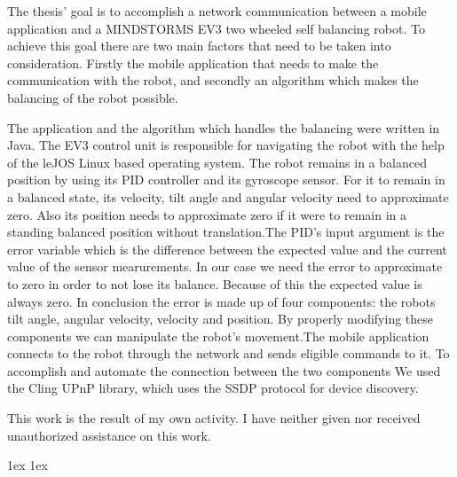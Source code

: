 \documentclass[final]{ubb_dolgozat}
\author{
Márton Zete-Örs
}
\begin{document}
\begin{abstractEN}
	
The thesis’ goal is to accomplish a network communication between a mobile application and a MINDSTORMS EV3 two wheeled self balancing robot. To achieve this goal there are two main factors that need to be taken into consideration. Firstly the mobile application that needs to make the communication with the robot, and secondly an algorithm which makes the balancing of the robot possible.

The application and the algorithm which handles the balancing were written in Java. The EV3 control unit is responsible for navigating the robot with the help of the leJOS Linux based operating system. The robot remains in a balanced position by using its PID controller and its gyroscope sensor. For it to remain in a balanced state, its velocity, tilt angle and angular velocity need to approximate zero. Also its position needs to approximate zero if it were to remain in a standing balanced position without translation.The PID’s input argument is the error variable which is the difference between the expected value and the current value of the sensor mearurements. In our case we need the error to approximate to zero in order to not lose its balance. Because of this the expected value is always zero. In conclusion the error is made up of four components: the robots tilt angle, angular velocity, velocity and position. By properly modifying these components we can manipulate the robot’s movement.The mobile application connects to the robot through the network and sends eligible commands to it. To accomplish and automate the connection between the two components We used the Cling UPnP library, which uses the SSDP protocol for device discovery.

This work is the result of my own activity. I have neither given nor received unauthorized assistance on this work.

\end{abstractEN}

\maketitle

{ \baselineskip 1ex
  \parskip 1ex
  \tableofcontents
}





%
%
%
\appendix

{ 
	\renewcommand{\baselinestretch}{1.4}\normalsize %
	\setlength{\itemsep}{-2.4mm}
	\setlength{\bibspacing}{0.67\baselineskip}
	
	
}
\end{document}
